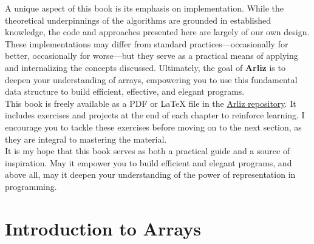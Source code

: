 \documentclass[12pt, oneside]{book}
\begin{document}
A unique aspect of this book is its emphasis on implementation. While the theoretical underpinnings of the algorithms are grounded in established knowledge, the code and approaches presented here are largely of our own design. These implementations may differ from standard practices—occasionally for better, occasionally for worse—but they serve as a practical means of applying and internalizing the concepts discussed. 
Ultimately, the goal of \textbf{Arliz} is to deepen your understanding of arrays, empowering you to use this fundamental data structure to build efficient, effective, and elegant programs. \\
This book is freely available as a PDF or LaTeX file in the \href{https://github.com/m-mdy-m/Arliz}{Arliz repository}. It includes exercises and projects at the end of each chapter to reinforce learning. I encourage you to tackle these exercises before moving on to the next section, as they are integral to mastering the material.\\ It is my hope that this book serves as both a practical guide and a source of inspiration. May it empower you to build efficient and elegant programs, and above all, may it deepen your understanding of the power of representation in programming.
\mainmatter
\chapter{Introduction to Arrays}
	
\end{document}
